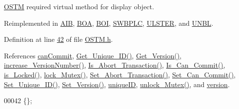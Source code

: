 \hyperlink{class_o_s_t_m}{O\+S\+TM} required virtual method for display object. 



Reimplemented in \hyperlink{class_a_i_b_aff0f0a0db75a17efec4bd500b888232d_aff0f0a0db75a17efec4bd500b888232d}{A\+IB}, \hyperlink{class_b_o_a_a348df0299997f81bcad0ec034dab0b8d_a348df0299997f81bcad0ec034dab0b8d}{B\+OA}, \hyperlink{class_b_o_i_ab02a4dd4ebcc5b2abfaca19f2dff2006_ab02a4dd4ebcc5b2abfaca19f2dff2006}{B\+OI}, \hyperlink{class_s_w_b_p_l_c_a761c77b5a204b4ae05ffb01bd602c3c2_a761c77b5a204b4ae05ffb01bd602c3c2}{S\+W\+B\+P\+LC}, \hyperlink{class_u_l_s_t_e_r_a341bbcb3f7d6ef10f30d4734ceed10ee_a341bbcb3f7d6ef10f30d4734ceed10ee}{U\+L\+S\+T\+ER}, and \hyperlink{class_u_n_b_l_a76d8bba21d64d79d8de63763b8acc1fd_a76d8bba21d64d79d8de63763b8acc1fd}{U\+N\+BL}.



Definition at line \hyperlink{_o_s_t_m_8h_source_l00042}{42} of file \hyperlink{_o_s_t_m_8h_source}{O\+S\+T\+M.\+h}.



References \hyperlink{_o_s_t_m_8h_source_l00104}{can\+Commit}, \hyperlink{_o_s_t_m_8cpp_source_l00073}{Get\+\_\+\+Unique\+\_\+\+I\+D()}, \hyperlink{_o_s_t_m_8cpp_source_l00089}{Get\+\_\+\+Version()}, \hyperlink{_o_s_t_m_8cpp_source_l00097}{increase\+\_\+\+Version\+Number()}, \hyperlink{_o_s_t_m_8cpp_source_l00126}{Is\+\_\+\+Abort\+\_\+\+Transaction()}, \hyperlink{_o_s_t_m_8cpp_source_l00112}{Is\+\_\+\+Can\+\_\+\+Commit()}, \hyperlink{_o_s_t_m_8cpp_source_l00147}{is\+\_\+\+Locked()}, \hyperlink{_o_s_t_m_8cpp_source_l00133}{lock\+\_\+\+Mutex()}, \hyperlink{_o_s_t_m_8cpp_source_l00119}{Set\+\_\+\+Abort\+\_\+\+Transaction()}, \hyperlink{_o_s_t_m_8cpp_source_l00105}{Set\+\_\+\+Can\+\_\+\+Commit()}, \hyperlink{_o_s_t_m_8cpp_source_l00066}{Set\+\_\+\+Unique\+\_\+\+I\+D()}, \hyperlink{_o_s_t_m_8cpp_source_l00081}{Set\+\_\+\+Version()}, \hyperlink{_o_s_t_m_8h_source_l00100}{unique\+ID}, \hyperlink{_o_s_t_m_8cpp_source_l00140}{unlock\+\_\+\+Mutex()}, and \hyperlink{_o_s_t_m_8h_source_l00096}{version}.


\begin{DoxyCode}
00042 \{\};
\end{DoxyCode}



